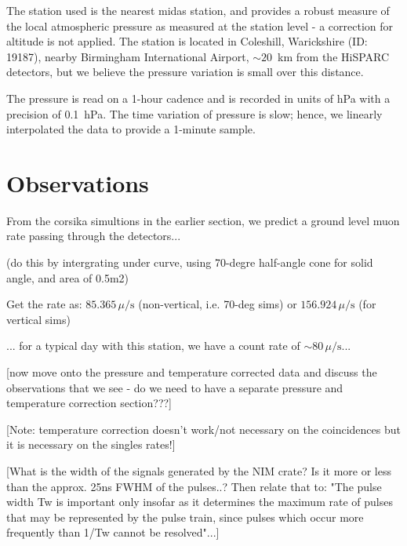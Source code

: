 The station used is the nearest \gls{midas} station, and provides a robust measure of the local atmospheric pressure as measured at the station level - a correction for altitude is not applied. The station is located in Coleshill, Warickshire (ID: 19187), nearby Birmingham International Airport, $\sim 20$~km from the HiSPARC detectors, but we believe the pressure variation is small over this distance.

The pressure is read on a 1-hour cadence and is recorded in units of hPa with a precision of 0.1~hPa. The time variation of pressure is slow; hence, we linearly interpolated the data to provide a 1-minute sample.




\section{Observations}\label{sec:HS_14008_observations}

From the \gls{corsika} simultions in the earlier section, we predict a ground level muon rate passing through the detectors...

(do this by intergrating under curve, using 70-degre half-angle cone for solid angle, and area of 0.5m2)

Get the rate as: $85.365 \, \mu/\mathrm{s}$ (non-vertical, i.e. 70-deg sims) or $156.924 \, \mu/\mathrm{s}$ (for vertical sims)

... for a typical day with this station, we have a count rate of $\sim 80 \, \mu/\mathrm{s}$...


[now move onto the pressure and temperature corrected data and discuss the observations that we see - do we need to have a separate pressure and temperature correction section???]

[Note: temperature correction doesn't work/not necessary on the coincidences but it is necessary on the singles rates!]


[What is the width of the signals generated by the NIM crate? Is it more or less than the approx. 25ns FWHM of the pulses..? Then relate that to: "The pulse width Tw is important only insofar as it determines the maximum rate of pulses that may be represented by the pulse train, since pulses which occur more frequently than 1/Tw cannot be resolved"...]


